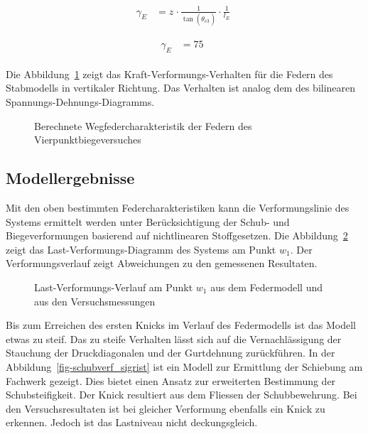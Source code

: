 \documentclass[
  11pt,
  letterpaper,
]{scrreprt}
\begin{document}
$$
\begin{aligned}
\gamma_{E_{_{}}} &= z_{_{}} \cdot \frac{ 1 }{ \tan \left( \theta_{c3_{_{}}} \right) } \cdot \frac{1} { l_{E} } \; 
\end{aligned}
$$

$$
\begin{aligned}
\gamma_{E_{_{}}} &= 75\ \;
\end{aligned}
$$

Die Abbildung~\ref{fig-wegfeder-schub-sv14} zeigt das
Kraft-Verformungs-Verhalten für die Federn des Stabmodells in vertikaler
Richtung. Das Verhalten ist analog dem des bilinearen
Spannungs-Dehnungs-Diagramms.

\begin{figure}[H]


\caption{\label{fig-wegfeder-schub-sv14}Berechnete
Wegfedercharakteristik der Federn des Vierpunktbiegeversuches}

\end{figure}%

\subsection{Modellergebnisse}\label{modellergebnisse-1}

Mit den oben bestimmten Federcharakteristiken kann die Verformungslinie
des Systems ermittelt werden unter Berücksichtigung der Schub- und
Biegeverformungen basierend auf nichtlinearen Stoffgesetzen. Die
Abbildung~\ref{fig-l-w-sv14} zeigt das Last-Verformungs-Diagramm des
Systems am Punkt \(w_1\). Der Verformungsverlauf zeigt Abweichungen zu
den gemessenen Resultaten.

\begin{figure}[H]


\caption{\label{fig-l-w-sv14}Last-Verformungs-Verlauf am Punkt \(w_1\)
aus dem Federmodell und aus den Versuchsmessungen}

\end{figure}%

Bis zum Erreichen des ersten Knicks im Verlauf des Federmodells ist das
Modell etwas zu steif. Das zu steife Verhalten lässt sich auf die
Vernachlässigung der Stauchung der Druckdiagonalen und der Gurtdehnung
zurückführen. In der Abbildung~\ref{fig-schubverf_sigrist} ist ein
Modell zur Ermittlung der Schiebung am Fachwerk gezeigt. Dies bietet
einen Ansatz zur erweiterten Bestimmung der Schubsteifigkeit. Der Knick
resultiert aus dem Fliessen der Schubbewehrung. Bei den
Versuchsresultaten ist bei gleicher Verformung ebenfalls ein Knick zu
erkennen. Jedoch ist das Lastniveau nicht deckungsgleich.
\end{document}
